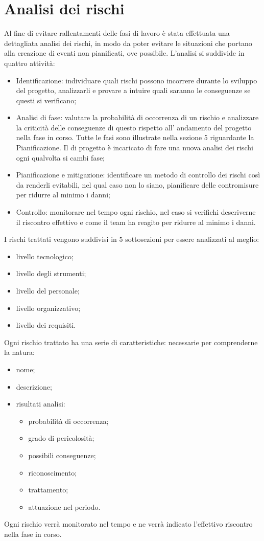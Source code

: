 \documentclass[PianoDiProgetto.tex]{subfiles}
\begin{document}
\section{Analisi dei rischi}
Al fine di evitare rallentamenti delle fasi di lavoro è stata effettuata una dettagliata analisi dei rischi, in modo da poter evitare le situazioni che portano alla creazione di eventi non pianificati, ove possibile. L'analisi si suddivide in quattro attività:
	\begin{itemize}
		\item Identificazione: individuare quali rischi possono incorrere durante lo sviluppo del progetto, analizzarli e provare a intuire quali saranno le conseguenze se questi si verificano;
		\item Analisi di fase: valutare la probabilità di occorrenza di un rischio e analizzare la criticità delle conseguenze di questo rispetto all' andamento del progetto nella fase in corso. Tutte le fasi sono illustrate nella sezione 5 riguardante la Pianificazione. Il \RESP di progetto è incaricato  di fare una nuova analisi dei rischi ogni qualvolta si cambi fase;
		\item Pianificazione e mitigazione: identificare un metodo di controllo dei rischi così da renderli evitabili, nel qual caso non lo siano, pianificare delle contromisure per ridurre al minimo i danni; 
		\item Controllo: monitorare nel tempo ogni rischio, nel caso si verifichi descriverne il riscontro effettivo e come il team ha reagito per ridurre al minimo i danni. 
	\end{itemize}
I rischi trattati vengono suddivisi in 5 sottosezioni per essere analizzati al meglio:
	\begin{itemize}
		\item livello tecnologico;
		\item livello degli strumenti;
		\item livello del personale;
		\item livello organizzativo;
		\item livello dei requisiti.
	\end{itemize}
Ogni rischio trattato ha una serie di caratteristiche: necessarie per comprenderne la natura:
	\begin{itemize}
		\item nome;
		\item descrizione;
		\item risultati analisi:
			\begin{itemize}
				\item probabilità di occorrenza;
				\item grado di pericolosità;
				\item possibili conseguenze;
				\item riconoscimento;
				\item trattamento;
				\item attuazione nel periodo.
			\end{itemize}
	\end{itemize}
Ogni rischio verrà monitorato nel tempo e ne verrà indicato l’effettivo riscontro nella fase in corso.
\end{document}
